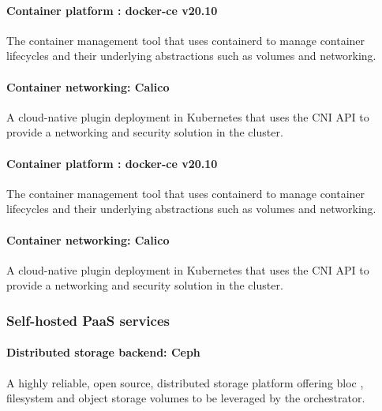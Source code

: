 \paragraph{Container platform : docker-ce v20.10 }

\hspace{7mm}The container management tool that uses containerd to manage container lifecycles and their underlying abstractions such as volumes and networking.  

\paragraph{Container networking: Calico }

\hspace{7mm}A cloud-native plugin deployment in Kubernetes that uses the CNI API to provide a networking and security solution in the cluster. 

\paragraph{Container platform : docker-ce v20.10 }

\hspace{7mm}The container management tool that uses containerd to manage container lifecycles and their underlying abstractions such as volumes and networking. 

\paragraph{Container networking: Calico }

\hspace{7mm}A cloud-native plugin deployment in Kubernetes that uses the CNI API to provide a networking and security solution in the cluster. 

\subsubsection{Self-hosted PaaS services }

\paragraph{Distributed storage backend: Ceph\cite{Ceph} }

\hspace{7mm}A highly reliable, open source, distributed storage platform offering bloc , filesystem and object storage volumes to be leveraged by the orchestrator. 


